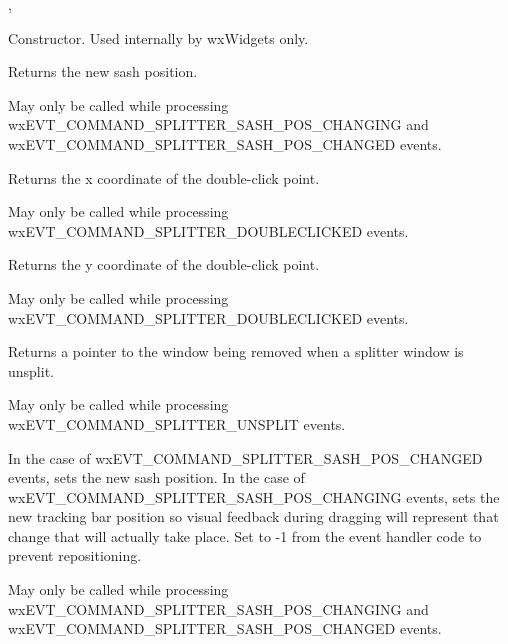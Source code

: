 
,\rtfsp
{}




\label{wxsplittereventconstr}


Constructor. Used internally by wxWidgets only.


\label{wxsplittereventgetsashposition}


Returns the new sash position.

May only be called while processing
wxEVT\_COMMAND\_SPLITTER\_SASH\_POS\_CHANGING and
wxEVT\_COMMAND\_SPLITTER\_SASH\_POS\_CHANGED events.


\label{wxsplittereventgetx}


Returns the x coordinate of the double-click point.

May only be called while processing
wxEVT\_COMMAND\_SPLITTER\_DOUBLECLICKED events.


\label{wxsplittereventgety}


Returns the y coordinate of the double-click point.

May only be called while processing
wxEVT\_COMMAND\_SPLITTER\_DOUBLECLICKED events.

\label{wxsplittereventgetwindowbeingremoved}


Returns a pointer to the window being removed when a splitter window
is unsplit.

May only be called while processing
wxEVT\_COMMAND\_SPLITTER\_UNSPLIT events.


\label{wxsplittereventsetsashposition}


In the case of wxEVT\_COMMAND\_SPLITTER\_SASH\_POS\_CHANGED events,
sets the new sash position. In the case of
wxEVT\_COMMAND\_SPLITTER\_SASH\_POS\_CHANGING events, sets the new
tracking bar position so visual feedback during dragging will
represent that change that will actually take place. Set to -1 from
the event handler code to prevent repositioning.

May only be called while processing
wxEVT\_COMMAND\_SPLITTER\_SASH\_POS\_CHANGING and
wxEVT\_COMMAND\_SPLITTER\_SASH\_POS\_CHANGED events.




